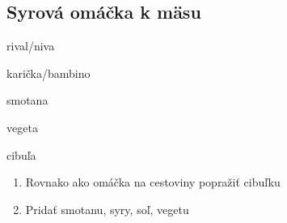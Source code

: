 \setcounter{step}{0}
\subsection{Syrová omáčka k mäsu}

\begin{ingredient}
\def\portions{4}%

\begin{main}
	\item rival/niva
	\item karička/bambino
	\item smotana
	\item vegeta
	\item cibuľa
\end{main}
\end{ingredient}
\begin{recipe}

\begin{enumerate}

\item{Rovnako ako omáčka na cestoviny popražiť cibuľku}
\item{Pridať smotanu, syry, soľ, vegetu}

\end{enumerate}
\end{recipe}

\begin{notes}

\end{notes}
\clearpage	